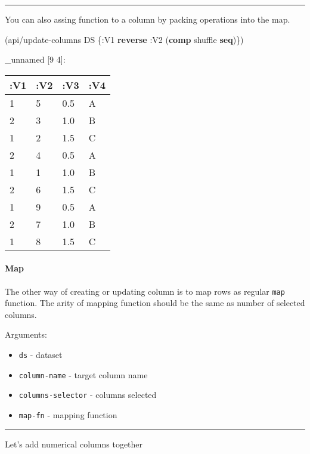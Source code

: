 \documentclass[]{article}
\newenvironment{Shaded}{\begin{snugshade}}{\end{snugshade}}
\newcommand{\AttributeTok}[1]{\textcolor[rgb]{0.77,0.63,0.00}{#1}}
\newcommand{\KeywordTok}[1]{\textcolor[rgb]{0.13,0.29,0.53}{\textbf{#1}}}
\newcommand{\NormalTok}[1]{#1}
\providecommand{\tightlist}{%
  \setlength{\itemsep}{0pt}\setlength{\parskip}{0pt}}
\let\oldparagraph\paragraph
\renewcommand{\paragraph}[1]{\oldparagraph{#1}\mbox{}}
\begin{document}
\begin{center}\rule{0.5\linewidth}{0.5pt}\end{center}

You can also assing function to a column by packing operations into the
map.

\begin{Shaded}
\begin{Highlighting}[]
\NormalTok{(api/update-columns DS \{}\AttributeTok{:V1} \KeywordTok{reverse}
                        \AttributeTok{:V2}\NormalTok{ (}\KeywordTok{comp}\NormalTok{ shuffle }\KeywordTok{seq}\NormalTok{)\})}
\end{Highlighting}
\end{Shaded}

\_unnamed {[}9 4{]}:

\begin{longtable}[]{@{}llll@{}}
\toprule
:V1 & :V2 & :V3 & :V4\tabularnewline
\midrule
\endhead
1 & 5 & 0.5 & A\tabularnewline
2 & 3 & 1.0 & B\tabularnewline
1 & 2 & 1.5 & C\tabularnewline
2 & 4 & 0.5 & A\tabularnewline
1 & 1 & 1.0 & B\tabularnewline
2 & 6 & 1.5 & C\tabularnewline
1 & 9 & 0.5 & A\tabularnewline
2 & 7 & 1.0 & B\tabularnewline
1 & 8 & 1.5 & C\tabularnewline
\bottomrule
\end{longtable}

\hypertarget{map}{%
\paragraph{Map}\label{map}}

The other way of creating or updating column is to map rows as regular
\texttt{map} function. The arity of mapping function should be the same
as number of selected columns.

Arguments:

\begin{itemize}
\tightlist
\item
  \texttt{ds} - dataset
\item
  \texttt{column-name} - target column name
\item
  \texttt{columns-selector} - columns selected
\item
  \texttt{map-fn} - mapping function
\end{itemize}

\begin{center}\rule{0.5\linewidth}{0.5pt}\end{center}

Let's add numerical columns together
\end{document}
